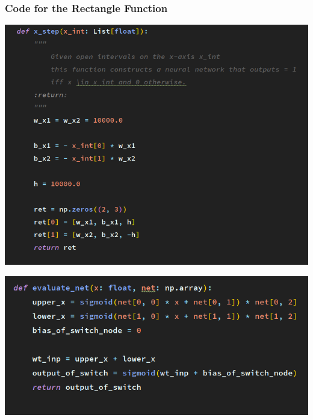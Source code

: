 \documentclass[11pt]{beamer}
\begin{document}
\begin{frame}[t]
\frametitle{Code for the Rectangle Function}
\begin{minipage}[b]{0.4\textwidth}
\begin{center}
\includegraphics[scale=0.25]{codeRectangleFunction.png}
\end{center}
\end{minipage}
\hspace{0.5cm}
\begin{minipage}[b]{0.4\textwidth}
\includegraphics[scale=0.25]{codeEvaluateRectangleFunction.png}
\end{minipage}
\end{frame}
\end{document}
